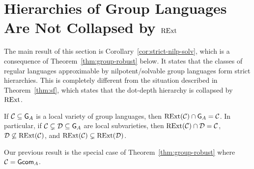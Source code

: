 \section{Hierarchies of Group Languages Are Not Collapsed by \(\mathrm{RExt}\)}\label{sec:group}

The main result of this section is Corollary~\ref{cor:strict-nilp-solv},
which is a consequence of Theorem~\ref{thm:group-robust} below. It states that
the classes of regular languages approximable by nilpotent/solvable group languages form strict hierarchies.
This is completely different from the situation described in Theorem~\ref{thm:sf},
which states that the dot-depth hierarchy is collapsed by \(\mathrm{RExt}\).

\begin{theorem}[Y.]\label{thm:group-robust}
  If \({\cal C} \subseteq \mathsf{G}_A\) is a local variety of group languages, then \(\mathrm{RExt}({\cal C}) \cap \mathsf{G}_A = {\cal C}\).
  In particular, if \({\cal C} \subsetneq {\cal D} \subseteq \mathsf{G}_A\) are local subvarieties,
  then \(\mathrm{RExt}({\cal C}) \cap {\cal D} = {\cal C}\), \({\cal D} \not\subseteq \mathrm{RExt}({\cal C})\), and \(\mathrm{RExt}({\cal C}) \subsetneq \mathrm{RExt}({\cal D})\).
\end{theorem}
Our previous result \cite[Theorem 1]{gcommeasure} is the special case of Theorem~\ref{thm:group-robust} where \({\cal C} = \mathsf{Gcom}_A\).


